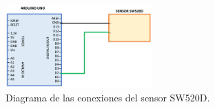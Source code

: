 \begin{itemize}
\begin{figure}[h!]
    \centering
    \includegraphics[width=0.5\textwidth]{img/SW520D.png}
    \caption{Diagrama de las conexiones del sensor SW520D.}
    \label{fig:SW520D} %
\end{figure}


\end{itemize}
